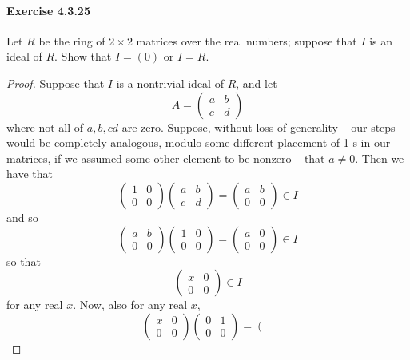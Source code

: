 \documentclass{article}
\begin{document}
\paragraph{Exercise 4.3.25} Let $R$ be the ring of $2 \times 2$ matrices over the real numbers; suppose that $I$ is an ideal of $R$. Show that $I = (0)$ or $I = R$.
\begin{proof}
    Suppose that $I$ is a nontrivial ideal of $R$, and let
$$
A=\left(\begin{array}{ll}
a & b \\
c & d
\end{array}\right)
$$
where not all of $a, b, c d$ are zero. Suppose, without loss of generality -- our steps would be completely analogous, modulo some different placement of 1 s in our matrices, if we assumed some other element to be nonzero -- that $a \neq 0$. Then we have that
$$
\left(\begin{array}{ll}
1 & 0 \\
0 & 0
\end{array}\right)\left(\begin{array}{ll}
a & b \\
c & d
\end{array}\right)=\left(\begin{array}{ll}
a & b \\
0 & 0
\end{array}\right) \in I
$$
and so
$$
\left(\begin{array}{ll}
a & b \\
0 & 0
\end{array}\right)\left(\begin{array}{ll}
1 & 0 \\
0 & 0
\end{array}\right)=\left(\begin{array}{ll}
a & 0 \\
0 & 0
\end{array}\right) \in I
$$
so that
$$
\left(\begin{array}{ll}
x & 0 \\
0 & 0
\end{array}\right) \in I
$$
for any real $x$. Now, also for any real $x$,
$$
\left(\begin{array}{ll}
x & 0 \\
0 & 0
\end{array}\right)\left(\begin{array}{ll}
0 & 1 \\
0 & 0
\end{array}\right)=\left(\begin{array}{ll}

\end{array}$$
\end{proof}
\end{document}
